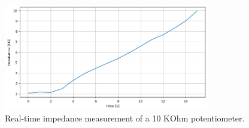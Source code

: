 \begin{figure}
\begin{centering}
\includegraphics[width=0.8\textwidth]{Cap2/Figures/imedances_signal_pot.png}
\par\end{centering}
\caption{Real-time impedance measurement of a 10 KOhm potentiometer.}
\label{fig:bci_drivers}
\end{figure}